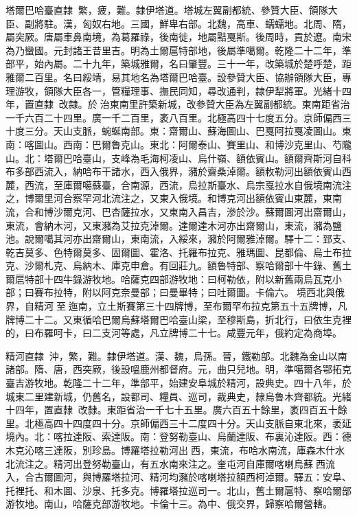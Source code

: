 \begin{pinyinscope}
塔爾巴哈臺直隸：繁，疲，難。隸伊塔道。塔城左翼副都統、參贊大臣、領隊大臣、副將駐。漢，匈奴右地。三國，鮮卑右部。北魏，高車、蠕蠕地。北周、隋，屬突厥。唐屬車鼻南境，為葛羅祿，後南徙，地屬黠戛斯。後周時，貢於遼。南宋為乃蠻國。元封諸王昔里吉。明為土爾扈特部地，後屬準噶爾。乾隆二十二年，準部平，始內屬。二十九年，築城雅爾，名曰肇豐。三十一年，改築城於楚呼楚，距雅爾二百里。名曰綏靖，易其地名為塔爾巴哈臺。設參贊大臣、協辦領隊大臣，專理游牧，領隊大臣各一，管糧理事、撫民同知，尋改通判，隸伊犁將軍。光緒十四年，置直隸，改隸。於治東南里許築新城，改參贊大臣為左翼副都統。東南距省治一千六百二十四里。廣一千二百里，袤八百里。北極高四十七度五分。京師偏西三十度三分。天山支脈，蜿蜒南部。東：齋爾山、蘇海圖山、巴戛阿拉戛凌圖山。東南：喀圖山。西南：巴爾魯克山。東北：阿爾泰山、賽里山、和博沙克里山、芍隴山。北：塔爾巴哈臺山，支峰為毛海柯凌山、烏什嶺、額依賓山。額爾齊斯河自科布多部西流入，納哈布干諸水，西入俄界，瀦於齋桑淖爾。額敉勒河出額依賓山西麓，西流，至庫爾噶蘇臺，合南源，西流，烏拉斯臺水、烏宗戛拉水自俄境南流注之，博爾里河合察罕河北流注之，又東入俄境。和博克河出額依賓山東麓，東南流，合和博沙爾克河、巴杏薩拉水，又東南入昌吉，滲於沙。蘇爾圖河出齋爾山，東流，會納木河，又東瀦為艾拉克淖爾。達爾達木河亦出齋爾山，東流，瀦為鹽池。說爾噶其河亦出齋爾山，東南流，入綏來，瀦於阿爾雅淖爾。驛十二：郅支、乾吉莫多、色特爾莫多、固爾圖、霍洛、托羅布拉克、雅瑪圖、昆都倫、烏土布拉克、沙爾札克、烏納木、庫克申倉。有回莊九。額魯特部、察哈爾部十牛錄、舊土爾扈特部十四牛錄游牧地。哈薩克四部游牧地：曰柯勒依，附以新舊兩烏瓦克小部；曰賽布拉特，附以阿克奈曼部；曰曼畢特；曰吐爾圖。卡倫六。境西北與俄界，自精河至迤南，立土斯賽第三十四牌博，至布爾罕布拉克第五十五牌博，凡牌博二十二。又東循哈巴爾烏蘇塔爾巴哈臺山梁，至穆斯島，折北行，曰依生克裡的，曰布羅呵卡，曰二支河等處，凡立牌博二十七。咸豐元年，俄約定為商埠。

精河直隸：沖，繁，難。隸伊塔道。漢、魏，烏孫。晉，鐵勒部。北魏為金山以南諸部。隋、唐，西突厥，後設嗢鹿州都督府。元，曲只兒地。明，準噶爾各鄂拓克臺吉游牧地。乾隆二十二年，準部平，始建安阜城於精河，設典史。四十八年，於城東二里建新城，仍舊名，設都司、糧員、巡司，裁典史，隸烏魯木齊都統。光緒十四年，置直隸，改隸。東距省治一千七十五里。廣六百五十餘里，袤四百五十餘里。北極高四十四度四十分。京師偏西三十二度四十分。天山支脈自東北來，袤延境內。北：喀拉達阪、索達阪。南：登努勒臺山、烏蘭達阪、布裏沁達阪。西：德木克沁喀三達阪，別珍島。博羅塔拉勒河出西，東流，布哈水南流，庫森木什水北流注之。精河出登努勒臺山，有五水南來注之。奎屯河自庫爾喀喇烏蘇西流入，合古爾圖河，與博羅塔拉河、精河均瀦於喀喇塔拉額西柯淖爾。驛五：安阜、托裡托、和木圖、沙泉、托多克。博羅塔拉巡司一。北山，舊土爾扈特、察哈爾部游牧地。南山，哈薩克部游牧地。卡倫十三。為中、俄交界，歸察哈爾營轄。


\end{pinyinscope}
